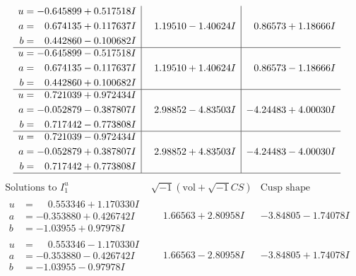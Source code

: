 \documentclass[1p]{elsarticle_modified}
\theoremstyle{definition}
\newcommand{\I}{\sqrt{-1}}
\begin{document}
$$\begin{array}{c|c|c}
\begin{aligned}
u &= -0.645899 + 0.517518 I \\
a &= \phantom{-}0.674135 + 0.117637 I \\
b &= \phantom{-}0.442860 - 0.100682 I\end{aligned}
 & \phantom{-}1.19510 - 1.40624 I & \phantom{-}0.86573 + 1.18666 I \\ \hline\begin{aligned}
u &= -0.645899 - 0.517518 I \\
a &= \phantom{-}0.674135 - 0.117637 I \\
b &= \phantom{-}0.442860 + 0.100682 I\end{aligned}
 & \phantom{-}1.19510 + 1.40624 I & \phantom{-}0.86573 - 1.18666 I \\ \hline\begin{aligned}
u &= \phantom{-}0.721039 + 0.972434 I \\
a &= -0.052879 - 0.387807 I \\
b &= \phantom{-}0.717442 - 0.773808 I\end{aligned}
 & \phantom{-}2.98852 - 4.83503 I & -4.24483 + 4.00030 I \\ \hline\begin{aligned}
u &= \phantom{-}0.721039 - 0.972434 I \\
a &= -0.052879 + 0.387807 I \\
b &= \phantom{-}0.717442 + 0.773808 I\end{aligned}
 & \phantom{-}2.98852 + 4.83503 I & -4.24483 - 4.00030 I\\
 \hline 
 \end{array}$$\newpage$$\begin{array}{c|c|c}  
\text{Solutions to }I^u_{1}& \I (\text{vol} + \sqrt{-1}CS) & \text{Cusp shape}\\
 \hline 
\begin{aligned}
u &= \phantom{-}0.553346 + 1.170330 I \\
a &= -0.353880 + 0.426742 I \\
b &= -1.03955 + 0.97978 I\end{aligned}
 & \phantom{-}1.66563 + 2.80958 I & -3.84805 - 1.74078 I \\ \hline\begin{aligned}
u &= \phantom{-}0.553346 - 1.170330 I \\
a &= -0.353880 - 0.426742 I \\
b &= -1.03955 - 0.97978 I\end{aligned}
 & \phantom{-}1.66563 - 2.80958 I & -3.84805 + 1.74078 I \\ \hline\begin{aligned}

\end{aligned}
\end{array}$$
\end{document}
